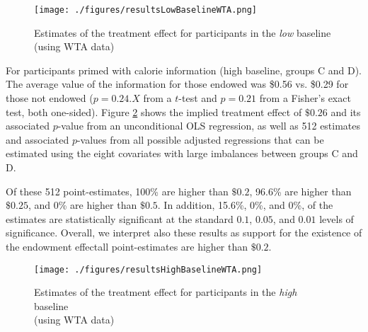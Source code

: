 
\begin{figure}[ht]
  \caption{Estimates of the treatment effect for participants in the \emph{low} baseline \\ (using WTA data)}\label{fig:resultsLowBaselineWTA}
  \begin{center}
  {\texttt{[image: ./figures/resultsLowBaselineWTA.png]}}
  \end{center}
\end{figure}

For participants primed with calorie information (high baseline, groups C and D). The average value of the information for those endowed was \$0.56 vs. \$0.29 for those not endowed ($p=0.24.X$ from a $t$-test and $p=0.21$ from a Fisher's exact test, both one-sided). Figure \ref{fig:resultsHighBaselineWTA} shows the implied treatment effect of $\$0.26$ and its associated $p$-value from an unconditional OLS regression, as well as 512 estimates and associated $p$-values from all possible adjusted regressions that can be estimated using the eight covariates with large imbalances between groups C and D.

Of these 512 point-estimates, 100\% are higher than $\$0.2$, 96.6\% are higher than $\$0.25$, and 0\% are higher than $\$0.5$. In addition, 15.6\%, 0\%, and 0\%, of the estimates are statistically significant at the standard $0.1$, $0.05$, and $0.01$ levels of significance. Overall, we interpret also these results as support for the existence of the endowment effect\textemdash all point-estimates are higher than $\$0.2$.

\begin{figure}[ht]
  \caption{Estimates of the treatment effect for participants in the \emph{high} baseline \\ (using WTA data)}\label{fig:resultsHighBaselineWTA}
  \begin{center}
  {\texttt{[image: ./figures/resultsHighBaselineWTA.png]}}
  \end{center}
\end{figure}
